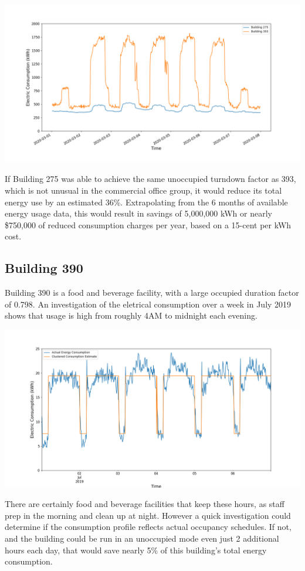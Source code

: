 \documentclass[a4paper]{article}
\begin{document}
\includegraphics[width=.9\columnwidth]{./images/275v393_Turndown.png}

If Building 275 was able to achieve the same unoccupied turndown factor as 393, which is not unusual in the commercial office group, it would reduce its total energy use by an estimated 36\%. Extrapolating from the 6 months of available energy usage data, this would result in savings of 5,000,000 kWh or nearly \$750,000 of reduced consumption charges per year, based on a 15-cent per kWh cost.

\subsection{Building 390}

Building 390 is a food and beverage facility, with a large occupied duration factor of 0.798. An investigation of the eletrical consumption over a week in July 2019 shows that usage is high from roughly 4AM to midnight each evening.

\includegraphics[width=.9\columnwidth]{./images/390_Duration.png}

There are certainly food and beverage facilities that keep these hours, as staff prep in the morning and clean up at night. However a quick investigation could determine if the consumption profile reflects actual occupancy schedules. If not, and the building could be run in an unoccupied mode even just 2 additional hours each day, that would save nearly 5\% of this building's total energy consumption.
\end{document}
